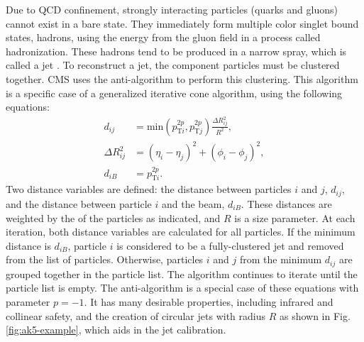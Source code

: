 Due to QCD confinement, strongly interacting particles (quarks and gluons) cannot exist in a bare state. They immediately form multiple color singlet bound states, hadrons, using the energy from the gluon field in a process called hadronization. These hadrons tend to be produced in a narrow spray, which is called a jet \cite{Salam:2009jx}. To reconstruct a jet, the component particles must be clustered together. CMS uses the anti-\kt algorithm \cite{Cacciari:2008gp} to perform this clustering. This algorithm is a specific case of a generalized iterative cone algorithm, using the following equations:
\begin{align}
d_{ij} &= \text{min}(p_{\text{T}i}^{2p},p_{\text{T}j}^{2p})\frac{\Delta R_{ij}^{2}}{R^{2}}, \\
\Delta R_{ij}^{2} &= (\eta_i - \eta_j)^2 + (\phi_i - \phi_j)^{2}, \\
d_{iB} &= p_{\text{T}i}^{2p}.
\end{align}
Two distance variables are defined: the distance between particles $i$ and $j$, $d_{ij}$, and the distance between particle $i$ and the beam, $d_{iB}$. These distances are weighted by the \pt of the particles as indicated, and $R$ is a size parameter. At each iteration, both distance variables are calculated for all particles. If the minimum distance is $d_{iB}$, particle $i$ is considered to be a fully-clustered jet and removed from the list of particles. Otherwise, particles $i$ and $j$ from the minimum $d_{ij}$ are grouped together in the particle list. The algorithm continues to iterate until the particle list is empty. The anti-\kt algorithm is a special case of these equations with parameter $p=-1$. It has many desirable properties, including infrared and collinear safety, and the creation of circular jets with radius $R$ as shown in Fig. \ref{fig:ak5-example}, which aids in the jet calibration.

